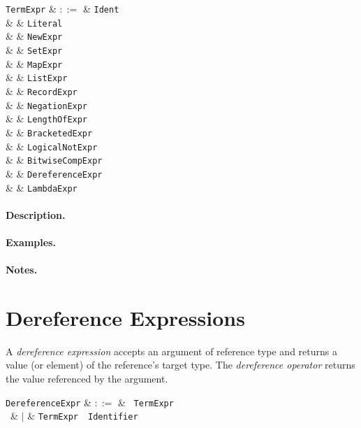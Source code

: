 \begin{syntax}
  \verb+TermExpr+ & $::=$ & \verb+Ident+\\
  & & \verb+Literal+\\
  & & \verb+NewExpr+\\
  & & \verb+SetExpr+\\
  & & \verb+MapExpr+\\
  & & \verb+ListExpr+\\
  & & \verb+RecordExpr+\\
  & & \verb+NegationExpr+\\
  & & \verb+LengthOfExpr+\\
  & & \verb+BracketedExpr+\\
  & & \verb+LogicalNotExpr+\\
  & & \verb+BitwiseCompExpr+\\
  & & \verb+DereferenceExpr+\\
  & & \verb+LambdaExpr+\\
\end{syntax}

\paragraph{Description.}

\paragraph{Examples.}

\paragraph{Notes.} 


\section{Dereference Expressions}
\label{c_expr_dereference}

A {\em dereference expression} accepts an argument of reference type and returns a value (or element) of the reference's target type.  The {\em dereference operator} returns the value referenced by the argument.  

\begin{syntax}
  \verb+DereferenceExpr+ & $::=$ & \token{*}\ \verb+TermExpr+\\\
  & $|$ & \verb+TermExpr+\ \token{->}\ \verb+Identifier+\\
\end{syntax}


